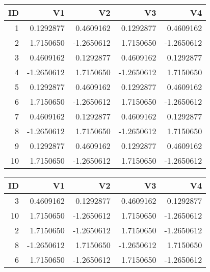 \documentclass[
]{book}
\newenvironment{Shaded}{\begin{snugshade}}{\end{snugshade}}
\newcommand{\KeywordTok}[1]{\textcolor[rgb]{0.13,0.29,0.53}{\textbf{#1}}}
\newcommand{\NormalTok}[1]{#1}
\newcommand{\OperatorTok}[1]{\textcolor[rgb]{0.81,0.36,0.00}{\textbf{#1}}}
\newcommand{\StringTok}[1]{\textcolor[rgb]{0.31,0.60,0.02}{#1}}
\begin{document}
\begin{table}[!h]
\centering
\begin{tabular}{r|r|r|r|r}
\hline
ID & V1 & V2 & V3 & V4\\
\hline
\rowcolor{gray!6}  1 & 0.1292877 & 0.4609162 & 0.1292877 & 0.4609162\\
\hline
2 & 1.7150650 & -1.2650612 & 1.7150650 & -1.2650612\\
\hline
\rowcolor{gray!6}  3 & 0.4609162 & 0.1292877 & 0.4609162 & 0.1292877\\
\hline
4 & -1.2650612 & 1.7150650 & -1.2650612 & 1.7150650\\
\hline
\rowcolor{gray!6}  5 & 0.1292877 & 0.4609162 & 0.1292877 & 0.4609162\\
\hline
6 & 1.7150650 & -1.2650612 & 1.7150650 & -1.2650612\\
\hline
\rowcolor{gray!6}  7 & 0.4609162 & 0.1292877 & 0.4609162 & 0.1292877\\
\hline
8 & -1.2650612 & 1.7150650 & -1.2650612 & 1.7150650\\
\hline
\rowcolor{gray!6}  9 & 0.1292877 & 0.4609162 & 0.1292877 & 0.4609162\\
\hline
10 & 1.7150650 & -1.2650612 & 1.7150650 & -1.2650612\\
\hline
\end{tabular}
\end{table}

\begin{Shaded}
\end{Shaded}

\begin{table}[!h]
\centering
\begin{tabular}{r|r|r|r|r}
\hline
ID & V1 & V2 & V3 & V4\\
\hline
\rowcolor{gray!6}  3 & 0.4609162 & 0.1292877 & 0.4609162 & 0.1292877\\
\hline
10 & 1.7150650 & -1.2650612 & 1.7150650 & -1.2650612\\
\hline
\rowcolor{gray!6}  2 & 1.7150650 & -1.2650612 & 1.7150650 & -1.2650612\\
\hline
8 & -1.2650612 & 1.7150650 & -1.2650612 & 1.7150650\\
\hline
\rowcolor{gray!6}  6 & 1.7150650 & -1.2650612 & 1.7150650 & -1.2650612\\
\hline
\end{tabular}
\end{table}
\end{document}
